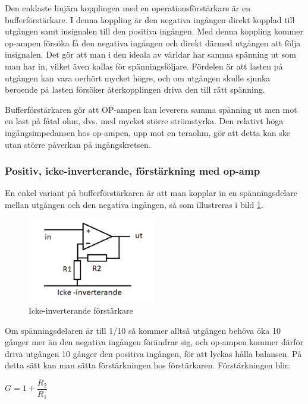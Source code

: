 Den enklaste linjära kopplingen med en operationsförstärkare är en
bufferförstärkare.
I denna koppling är den negativa ingången direkt kopplad till utgången
samt insignalen till den positiva ingången.
Med denna koppling kommer op-ampen försöka få den negativa ingången och direkt
därmed utgången att följa insignalen.
Det gör att man i den ideala av världar har samma spänning ut som man har in,
vilket även kallas för spänningsföljare.
Fördelen är att lasten på utgången kan vara oerhört mycket högre, och
om utgången skulle sjunka beroende på lasten försöker återkopplingen driva den
till rätt spänning.

Bufferförstärkaren gör att OP-ampen kan leverera samma spänning ut men mot en
last på fåtal ohm, dvs. med mycket större strömstyrka.
Den relativt höga ingångsimpedansen hos op-ampen, upp mot en teraohm, gör att detta
kan ske utan större påverkan på ingångskretsen.

\subsubsection{Positiv, icke-inverterande, förstärkning med op-amp}
\label{icke-inverterande förstärkning}

En enkel variant på bufferförstärkaren är att man kopplar in en spänningsdelare
mellan utgången och den negativa ingången, så som illustreras i bild
\ref{fig:BildII2-46}.

\begin{figure}
	\includegraphics[width=0.5\textwidth]{images/cropped_pdfs/bild_2_2-46.pdf}
	\caption{Icke-inverterande förstärkare}
	\label{fig:BildII2-46}
\end{figure}

Om spänningsdelaren är till 1/10 så kommer alltså utgången behöva öka 10 gånger
mer än den negativa ingången förändrar sig, och op-ampen kommer därför driva
utgången 10 gånger den positiva ingången, för att lyckas hålla balansen.
På detta sätt kan man sätta förstärkningen hos förstärkaren.
Förstärkningen blir:

\(G = 1+ \dfrac{R_2}{R_1}\)

